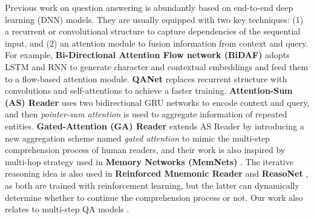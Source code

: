 
Previous work on question answering is abundantly based on end-to-end deep learning (DNN) models. They are usually equipped with two key techniques: (1) a recurrent or convolutional structure to capture dependencies of the sequential input, and (2) an attention module to fusion information from context and query. For example, \textbf{Bi-Directional Attention Flow network (BiDAF)} \cite{DBLP:conf/iclr/SeoKFH17} adopts LSTM and RNN to generate character and contextual embeddings and feed them to a flow-based attention module. \textbf{QANet} \cite{DBLP:journals/corr/abs-1804-09541} replaces recurrent structure with convolutions and self-attentions to achieve a faster training. \textbf{Attention-Sum (AS) Reader} \cite{DBLP:conf/acl/KadlecSBK16} uses two bidirectional GRU networks to encode context and query, and then \textit{pointer-sum attention} is used to aggregate information of repeated entities. \textbf{Gated-Attention (GA) Reader} \cite{DBLP:conf/acl/DhingraLYCS17} extends AS Reader by introducing a new aggregation scheme named \textit{gated attention} to mimic the multi-step comprehension process of human readers, and their work is also inspired by multi-hop strategy used in \textbf{Memory Networks (MemNets)} \cite{DBLP:conf/nips/SukhbaatarSWF15}. The iterative reasoning idea is also used in \textbf{Reinforced Mnemonic Reader} \cite{DBLP:conf/ijcai/HuPHQW018} and \textbf{ReasoNet} \cite{DBLP:conf/kdd/ShenHGC17}, as both are trained with reinforcement learning, but the latter can dynamically determine whether to continue the comprehension process or not. Our work also relates to multi-step QA models \cite{DBLP:journals/corr/SordoniBB16,DBLP:conf/acl/MinZZH19}. %

